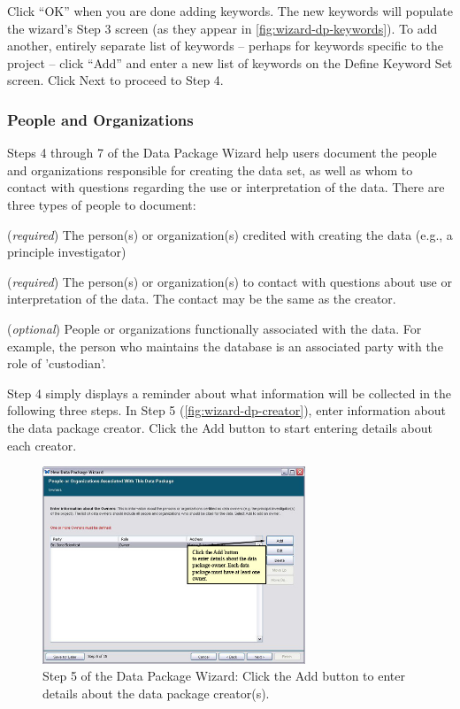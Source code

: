 Click ``OK'' when you are done adding keywords. The new keywords will
populate the wizard's Step 3 screen (as they appear in
\autoref{fig:wizard-dp-keywords}). To add another, entirely separate
list of keywords -- perhaps for keywords specific to the project --
click ``Add'' and enter a new list of keywords on the Define Keyword Set
screen. Click Next to proceed to Step 4.

\subsubsection{People and Organizations} \label{sec:wizard-dp-people}

Steps 4 through 7 of the Data Package Wizard help users document the
people and organizations responsible for creating the data set, as well
as whom to contact with questions regarding the use or interpretation of
the data. There are three types of people to document:
\begin{description}
  \setlength{\parskip}{1pt}
  \item [Creator] (\emph{required}) The person(s) or organization(s) credited with
    creating the data (e.g., a principle investigator)
  \item [Contact] (\emph{required}) The person(s) or organization(s) to contact
    with questions about use or interpretation of the data. The contact
    may be the same as the creator.
  \item [Associated parties] (\emph{optional}) People or organizations
    functionally associated with the data. For example, the person who
    maintains the database is an associated party with the role of
    'custodian'.
\end{description}

Step 4 simply displays a reminder about what information will be
collected in the following three steps. In Step 5
(\autoref{fig:wizard-dp-creator}), enter information about the data
package creator. Click the Add button to start entering details about each
creator.

\begin{figure}
  \centering
    \includegraphics[width=0.7\textwidth]{images/wizard-dp-creator.jpg}
  \caption{Step 5 of the Data Package Wizard: Click the Add button to
    enter details about the data package creator(s).}
  \label{fig:wizard-dp-creator}
\end{figure}

